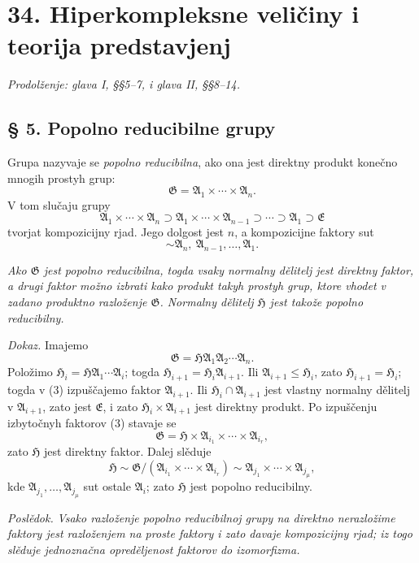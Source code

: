 \documentclass[11pt]{article}
\providecommand{\mG}{\mathfrak{G}}
\providecommand{\mA}{\mathfrak{A}}
\providecommand{\mE}{\mathfrak{E}}
\providecommand{\mH}{\mathfrak{H}}
\begin{document}
\setcounter{footnote}{0}
\section*{34. Hiperkompleksne veličiny i teorija predstavjenj}
\emph{Prodolženje: glava I, §§5--7, i glava II, §§8--14.}

\subsection*{§ 5. Popolno reducibilne grupy}

Grupa nazyvaje se \emph{popolno reducibilna}, ako ona jest direktny produkt konečno mnogih prostyh grup:
\[
        \mG=\mA_1\times\cdots\times\mA_n.
\]
V tom slučaju grupy
\[
        \mA_1\times\cdots\times\mA_n
        \supset \mA_1\times\cdots\times\mA_{n-1}
        \supset\cdots\supset \mA_1\supset \mE
\]
tvorjat kompozicijny rjad. Jego dolgost jest $n$, a kompozicijne faktory sut
\[
        \sim \mA_n,\ \mA_{n-1},\ldots,\mA_1.
\]

\emph{Ako $\mG$ jest popolno reducibilna, togda vsaky normalny dělitelj jest direktny faktor, a drugi faktor možno izbrati kako produkt takyh prostyh grup, ktore vhodet v zadano produktno razloženje $\mG$. Normalny dělitelj $\mH$ jest takože popolno reducibilny.}

\emph{Dokaz.} Imajemo
\begin{equation}
        \mG=\mH\mA_1\mA_2\cdots\mA_n.             \tag{3}
\end{equation}
Položimo $\mH_i=\mH\mA_1\cdots\mA_i$; togda $\mH_{i+1}=\mH_i\mA_{i+1}$. Ili $\mA_{i+1}\leq \mH_i$, zato $\mH_{i+1}=\mH_i$; togda v (3) izpuščajemo faktor $\mA_{i+1}$. Ili $\mH_i\cap\mA_{i+1}$ jest vlastny normalny dělitelj v $\mA_{i+1}$, zato jest $\mE$, i zato $\mH_i\times\mA_{i+1}$ jest direktny produkt. Po izpuščenju izbytočnyh faktorov (3) stavaje se
\[
        \mG=\mH\times\mA_{i_1}\times\cdots\times\mA_{i_r},
\]
zato $\mH$ jest direktny faktor. Dalej slěduje
\[
        \mH\sim \mG/(\mA_{i_1}\times\cdots\times\mA_{i_r})
        \sim \mA_{j_1}\times\cdots\times\mA_{j_\mu},
\]
kde $\mA_{j_1},\ldots,\mA_{j_\mu}$ sut ostale $\mA_i$; zato $\mH$ jest popolno reducibilny.

\emph{Poslědok.} \emph{Vsako razloženje popolno reducibilnoj grupy na direktno nerazložime faktory jest razloženjem na proste faktory i zato davaje kompozicijny rjad; iz togo slěduje jednoznačna opreděljenost faktorov do izomorfizma.}
\end{document}

